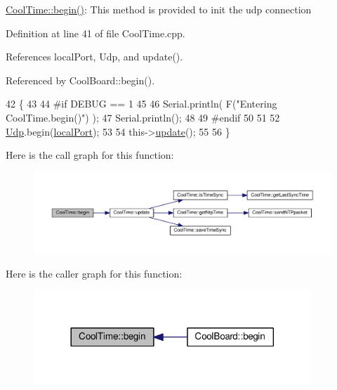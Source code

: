 \hyperlink{classCoolTime_ab1976cf718b950bc31e003c3323b8adb}{Cool\+Time\+::begin()}\+: This method is provided to init the udp connection 

Definition at line 41 of file Cool\+Time.\+cpp.



References local\+Port, Udp, and update().



Referenced by Cool\+Board\+::begin().


\begin{DoxyCode}
42 \{
43 
44 \textcolor{preprocessor}{#if DEBUG == 1 }
45 
46     Serial.println( F(\textcolor{stringliteral}{"Entering CoolTime.begin()"}) );
47     Serial.println();
48 
49 \textcolor{preprocessor}{#endif }
50 
51 
52     \hyperlink{classCoolTime_a4e23216a8121ca79d0fb019f30884b92}{Udp}.begin(\hyperlink{classCoolTime_a2f777da44d7ba678be8185299e9b49d1}{localPort});
53     
54     this->\hyperlink{classCoolTime_aae601f795452cfa48d9fb337aed483a8}{update}();
55     
56 \}
\end{DoxyCode}
Here is the call graph for this function\+:
\nopagebreak
\begin{figure}[H]
\begin{center}
\leavevmode
\includegraphics[width=350pt]{classCoolTime_ab1976cf718b950bc31e003c3323b8adb_cgraph}
\end{center}
\end{figure}
Here is the caller graph for this function\+:
\nopagebreak
\begin{figure}[H]
\begin{center}
\leavevmode
\includegraphics[width=296pt]{classCoolTime_ab1976cf718b950bc31e003c3323b8adb_icgraph}
\end{center}
\end{figure}
\mbox{\label{classCoolTime_a87c28260c1bc77091162cbcf1ee2e129}} 

